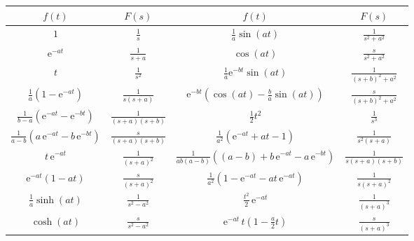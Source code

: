 \documentclass[a4paper,11pt,oneside,open=any,parskip=half, DIV=15]{scrreprt}
\begin{document}
      \begin{center}
      {\setlength{\tabcolsep}{12pt}%
      \renewcommand{\arraystretch}{1.3}%
      \begin{tabular}{|c|c||c|c|}  %
         \hline   %
         \(f(t)\) & \(F(s)\) & \(f(t)\) & \(F(s)\) \\
         \hline\hline   %
         \(1\) & \(\tfrac{1}{s}\) & \(\tfrac{1}{a}\sin(at)\) & \(\tfrac{1}{s^{2}+a^{2}}\) \\
         \hline   %
         \(\mathrm e^{-at}\) & \(\tfrac{1}{s+a}\) & \(\cos(at)\) & \(\tfrac{s}{s^{2}+a^{2}}\) \\
         \hline   %
         \(t\) & \(\tfrac{1}{s^{2}}\) & \(\tfrac{1}{a}\mathrm e^{-bt}\sin(at)\) & \(\tfrac{1}{(s+b)^{2}+a^{2}}\) \\  %
         \hline   %
         \(\tfrac{1}{a}(1-\mathrm e^{-at})\) & \(\tfrac{1}{s(s+a)}\) & \(\mathrm e^{-bt}\!\left(\cos(at)-\tfrac{b}{a}\sin(at)\right)\) & \(\tfrac{s}{(s+b)^{2}+a^{2}}\) \\ %
         \hline   %
         \(\tfrac{1}{b-a}(\mathrm e^{-at}-\mathrm e^{-bt})\) & \(\tfrac{1}{(s+a)(s+b)}\) & \(\tfrac{1}{2}t^{2}\) & \(\tfrac{1}{s^{3}}\) \\
         \hline   %
         \(\tfrac{1}{a-b}(a\,\mathrm e^{-at}-b\,\mathrm e^{-bt})\) & \(\tfrac{s}{(s+a)(s+b)}\) & \(\tfrac{1}{a^{2}}(\mathrm e^{-at}+at-1)\) & \(\tfrac{1}{s^{2}(s+a)}\) \\
         \hline   %
         \(t\,\mathrm e^{-at}\) & \(\tfrac{1}{(s+a)^{2}}\) & \(\tfrac{1}{ab(a-b)}\!\left((a-b)+b\,\mathrm e^{-at}-a\,\mathrm e^{-bt}\right)\) & \(\tfrac{1}{s(s+a)(s+b)}\) \\ %
         \hline   %
         \(\mathrm e^{-at}(1-at)\) & \(\tfrac{s}{(s+a)^{2}}\) & \(\tfrac{1}{a^{2}}\!\left(1-\mathrm e^{-at}-at\,\mathrm e^{-at}\right)\) & \(\tfrac{1}{s(s+a)^{2}}\) \\ %
         \hline   %
         \(\tfrac{1}{a}\sinh(at)\) & \(\tfrac{1}{s^{2}-a^{2}}\) & \(\tfrac{t^{2}}{2}\,\mathrm e^{-at}\) & \(\tfrac{1}{(s+a)^{3}}\) \\  %
         \hline   %
         \(\cosh(at)\) & \(\tfrac{s}{s^{2}-a^{2}}\) & \(\mathrm e^{-at}\,t\!\left(1-\tfrac{a}{2}t\right)\) & \(\tfrac{s}{(s+a)^{3}}\) \\  %
         \hline   %
      \end{tabular}
      }
      \end{center}
\end{document}
